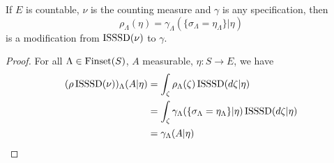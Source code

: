\begin{lemma}
    \label{lem:exists-modification-countable}

    If $E$ is countable, $\nu$ is the counting measure and $\gamma$ is any specification, then
    $$\rho_\Lambda(\eta) = \gamma_\Lambda(\{\sigma_\Lambda = \eta_\Lambda\} | \eta)$$
    is a modification from $\operatorname{ISSSD}(\nu)$ to $\gamma$.
\end{lemma}
\begin{proof}

    For all $\Lambda \in \operatorname{Finset}(S)$, $A$ measurable, $\eta : S \to E$, we have
    \begin{align}
        (\rho\operatorname{ISSSD}(\nu))_\Lambda(A|\eta)
        & = \int_\zeta \rho_\Lambda(\zeta) \operatorname{ISSSD}(d\zeta|\eta) \\
        & = \int_\zeta \gamma_\Lambda(\{\sigma_\Lambda = \eta_\Lambda\} | \eta) \operatorname{ISSSD}(d\zeta|\eta) \\
        & = \gamma_\Lambda(A|\eta)
    \end{align}
\end{proof}
